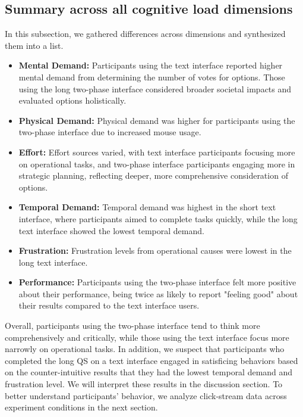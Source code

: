 \subsection{Summary across all cognitive load dimensions}
In this subsection, we gathered differences across dimensions and synthesized them into a list. 
\begin{itemize}
    \item \textbf{Mental Demand:} Participants using the text interface reported higher mental demand from determining the number of votes for options. Those using the long two-phase interface considered broader societal impacts and evaluated options holistically.
    \item \textbf{Physical Demand:} Physical demand was higher for participants using the two-phase interface due to increased mouse usage.
    \item \textbf{Effort:} Effort sources varied, with text interface participants focusing more on operational tasks, and two-phase interface participants engaging more in strategic planning, reflecting deeper, more comprehensive consideration of options.
    \item \textbf{Temporal Demand:} Temporal demand was highest in the short text interface, where participants aimed to complete tasks quickly, while the long text interface showed the lowest temporal demand.
    \item \textbf{Frustration:} Frustration levels from operational causes were lowest in the long text interface.
    \item \textbf{Performance:} Participants using the two-phase interface felt more positive about their performance, being twice as likely to report "feeling good" about their results compared to the text interface users.
\end{itemize}

Overall, participants using the two-phase interface tend to think more comprehensively and critically, while those using the text interface focus more narrowly on operational tasks. In addition, we suspect that participants who completed the long QS on a text interface engaged in satisficing behaviors based on the counter-intuitive results that they had the lowest temporal demand and frustration level. We will interpret these results in the discussion section. To better understand participants' behavior, we analyze click-stream data across experiment conditions in the next section.





